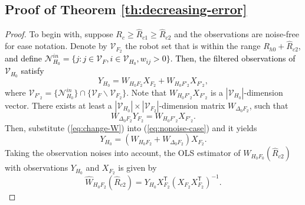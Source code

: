 \documentclass[12pt,journal,draftclsnofoot,onecolumn]{IEEEtran}
\let \sss=\scriptscriptstyle
\begin{document}
\subsection{Proof of Theorem \ref{th:decreasing-error}}\label{apdix:decreasing-error}
\begin{proof}
To begin with, suppose $R_c \ge \hat{R}_{c1}\ge  \hat{R}_{c2}$ and the observations are noise-free for ease notation. 
Denote by $\mathcal{V}_{\sss F_2}$ the robot set that is within the range $R_{h0}+\hat{R}_{c2}$, 
\textcolor{black}{and define $\mathcal{N}_{\sss H_0}^{in}=\{j:j\in\mathcal{V}_{\sss F}, i\in\mathcal{V}_{\sss H_0}, w_{ij}>0\}$. 
Then, the filtered observations of $\mathcal{V}_{\sss H_0}$ satisfy}
\begin{equation}\label{eq:nonoise-case}
Y_{\sss H_0} = {  W_{\sss{H_0 F_2}} } X_{\sss{F_2}}  + {  W_{\sss{H_0 F'_2}} } X_{\sss{F'_2}},
\end{equation}
where $\mathcal{V}_{\sss F'_2}=\{\mathcal{N}_{\sss H_0}^{in} \}\cap \{\mathcal{V}_{\sss F}\backslash\mathcal{V}_{\sss F_2}\}$. 
Note that ${  W_{\sss{H_0 F'_2}} } X_{\sss{F'_2}}$ is a ${|\mathcal{V}_{H_0}|}$-dimension vector. 
There exists at least a $|\mathcal{V}_{H_0}| \times | \mathcal{V}_{F_2} |$-dimension matrix $W_{\Delta_0 \sss{F_2}} $, such that 
\begin{equation}\label{eq:change-W}
W_{\Delta_0 \sss{F_2}}   Y_{\sss{F_2}} =  {  W_{\sss{H_0 F'_2}} } X_{\sss{F'_2}}. 
\end{equation} 
Then, substitute (\ref{eq:change-W}) into (\ref{eq:nonoise-case}) and it yields  
\begin{equation}\label{eq:nonoise-case2}
Y_{\sss H_0} = ( {  W_{\sss{H_0 F_2}} } + W_{\Delta_0 \sss{F_2}} )X_{\sss{F_2}}. 
\end{equation}
Taking the observation noises into account, the OLS estimator of $W_{\sss{H_0 F_0}}(\hat{R}_{c2})$ with observations $Y_{\sss H_0}$ and $X_{\sss{F_2}}$ is given by 
\begin{equation}
\hat W_{\sss{H_0 F_2}}(\hat{R}_{c2}) = Y_{\sss H_0} X_{\sss F_2}^\mathsf{T} ( X_{\sss F_2} X_{\sss F_2}^\mathsf{T})^{-1}. 
\end{equation}



\end{proof}
\end{document}
